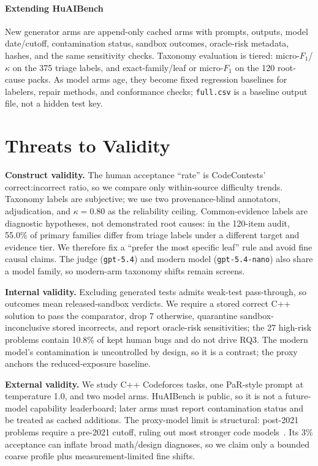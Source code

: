 \documentclass[conference]{IEEEtran}
\begin{document}
\paragraph{Extending HuAIBench}
New generator arms are append-only cached arms with prompts, outputs, model
date/cutoff, contamination status, sandbox outcomes, oracle-risk metadata, hashes,
and the same sensitivity checks. Taxonomy evaluation is tiered: micro-$F_1$/$\kappa$
on the 375 triage labels, and exact-family/leaf or micro-$F_1$ on the 120
root-cause packs. As model arms age, they become fixed regression baselines for
labelers, repair methods, and conformance checks; \texttt{full.csv} is a baseline
output file, not a hidden test key.

\section{Threats to Validity}
\label{sec:threats}
\textbf{Construct validity.} The human acceptance ``rate'' is CodeContests'
correct:incorrect ratio, so we compare only within-source difficulty trends.
Taxonomy labels are subjective; we use two provenance-blind annotators,
adjudication, and $\kappa=0.80$ as the reliability ceiling. Common-evidence labels
are diagnostic hypotheses, not demonstrated root causes: in the 120-item audit,
55.0\% of primary families differ from triage labels under a different target and
evidence tier. We therefore fix a ``prefer
the most specific leaf'' rule and avoid fine causal claims. The judge
(\texttt{gpt-5.4}) and modern model (\texttt{gpt-5.4-nano}) also share a model
family, so modern-arm taxonomy shifts remain screens.

\textbf{Internal validity.} Excluding generated tests admits weak-test
pass-through, so outcomes mean released-sandbox verdicts. We require a stored
correct C++ solution to pass the comparator, drop 7 otherwise, quarantine
sandbox-inconclusive stored incorrects, and report oracle-risk sensitivities; the
27 high-risk problems contain 10.8\% of kept human bugs and do not drive RQ3. The
modern model's contamination is uncontrolled by design, so it is a contrast; the
proxy anchors the reduced-exposure baseline.

\textbf{External validity.} We study C++ Codeforces tasks, one PaR-style prompt at
temperature 1.0, and two model arms. HuAIBench is public, so it is not a future-model
capability leaderboard; later arms must report contamination status and be treated
as cached additions. The proxy-model limit is structural: post-2021 problems require
a pre-2021 cutoff, ruling out most stronger code models~\cite{jain2024livecodebench}.
Its 3\% acceptance can inflate broad math/design diagnoses, so we claim only a
bounded coarse profile plus measurement-limited fine shifts.
\end{document}
